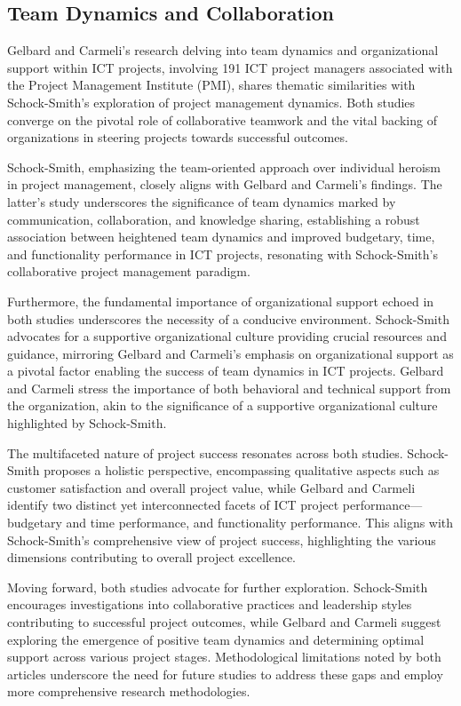 \documentclass[runningheads]{llncs}
\begin{document}
\subsection{Team Dynamics and Collaboration}
Gelbard and Carmeli's research \cite{ref_5} delving into team dynamics and organizational support within ICT projects, involving 191 ICT project managers associated with the Project Management Institute (PMI), shares thematic similarities with Schock-Smith's exploration of project management dynamics. Both studies converge on the pivotal role of collaborative teamwork and the vital backing of organizations in steering projects towards successful outcomes.

Schock-Smith, emphasizing the team-oriented approach over individual heroism in project management, closely aligns with Gelbard and Carmeli's findings. The latter's study underscores the significance of team dynamics marked by communication, collaboration, and knowledge sharing, establishing a robust association between heightened team dynamics and improved budgetary, time, and functionality performance in ICT projects, resonating with Schock-Smith's collaborative project management paradigm.

Furthermore, the fundamental importance of organizational support echoed in both studies underscores the necessity of a conducive environment. Schock-Smith advocates for a supportive organizational culture providing crucial resources and guidance, mirroring Gelbard and Carmeli's emphasis on organizational support as a pivotal factor enabling the success of team dynamics in ICT projects. Gelbard and Carmeli stress the importance of both behavioral and technical support from the organization, akin to the significance of a supportive organizational culture highlighted by Schock-Smith.

The multifaceted nature of project success resonates across both studies. Schock-Smith proposes a holistic perspective, encompassing qualitative aspects such as customer satisfaction and overall project value, while Gelbard and Carmeli identify two distinct yet interconnected facets of ICT project performance—budgetary and time performance, and functionality performance. This aligns with Schock-Smith's comprehensive view of project success, highlighting the various dimensions contributing to overall project excellence.

Moving forward, both studies advocate for further exploration. Schock-Smith encourages investigations into collaborative practices and leadership styles contributing to successful project outcomes, while Gelbard and Carmeli suggest exploring the emergence of positive team dynamics and determining optimal support across various project stages. Methodological limitations noted by both articles underscore the need for future studies to address these gaps and employ more comprehensive research methodologies.
\end{document}
